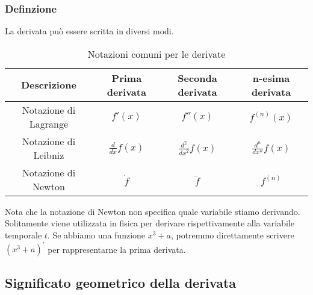 \documentclass{article}
\begin{document}
\subsubsection{Definzione}


La derivata può essere scritta in diversi modi.

\begin{table}[h]
    \centering
    \renewcommand{\arraystretch}{1.5}
    \begin{tabular}{|c|c|c|c|}
    \hline
    \textbf{Descrizione} & \textbf{Prima derivata} & \textbf{Seconda derivata} & \textbf{n-esima derivata} \\
    \hline
    Notazione di Lagrange & $f'(x)$ & $f''(x)$ & $f^{(n)}(x)$ \\
    \hline
    Notazione di Leibniz & $\frac{d}{dx} f(x)$ & $\frac{d^2}{dx^2} f(x)$ & $\frac{d^n}{dx^n} f(x)$ \\
    \hline
    Notazione di Newton & $\dot{f}$ & $\ddot{f}$ & $f^{(n)}$ \\
    \hline
    \end{tabular}
    \caption{Notazioni comuni per le derivate}
    \label{tab:derivate}
\end{table}

Nota che la notazione di Newton non specifica quale variabile stiamo derivando. Solitamente
viene utilizzata in fisica per derivare rispettivamente alla variabile temporale \(t\).
Se abbiamo una funzione \(x^3+a\), potremmo direttamente scrivere \((x^3+a)^{'}\)
per rappresentarne la prima derivata.

\subsection{Significato geometrico della derivata}
\end{document}
